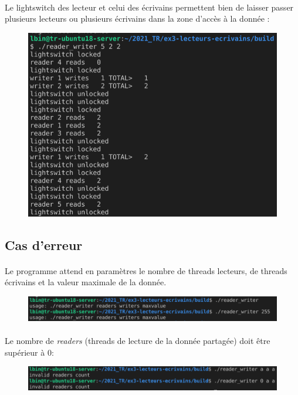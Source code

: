 \documentclass{article}
\begin{document}
    \paragraph{}
    Le lightswitch des lecteur et celui des écrivains permettent bien de laisser passer plusieurs lecteurs ou plusieurs écrivains dans la zone d'accès à la donnée :
    \begin{figure}[H]
        \centering
        \includegraphics[width=.6\textwidth]{./screenshots/test_lightswitch.png}
    \end{figure}

    \subsection{Cas d'erreur}
    \paragraph{}
    Le programme attend en paramètres le nombre de threads lecteurs, de threads écrivains et la valeur maximale de la donnée.
    \begin{figure}[H]
        \centering
        \includegraphics[width=.8\textwidth]{./screenshots/invalid_args.png}
    \end{figure}

    \paragraph{}
    Le nombre de \emph{readers} (threads de lecture de la donnée partagée) doit être supérieur à 0:
    \begin{figure}[H]
        \centering
        \includegraphics[width=.8\textwidth]{./screenshots/invalid_readers_count.png}
    \end{figure}
\end{document}
